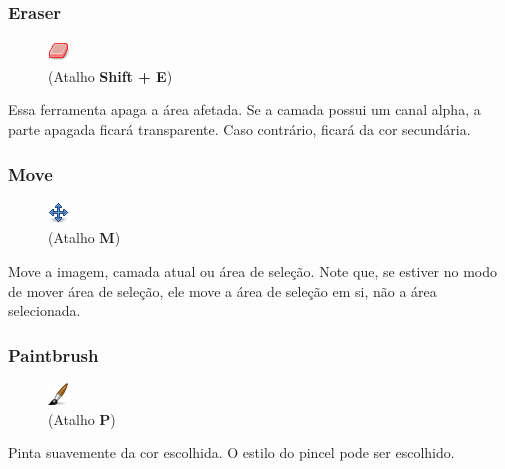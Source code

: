 \documentclass[12pt,onecolumn]{article}
\begin{document}
    \subsubsection{Eraser}
    \begin{figure}
      \vspace{-40pt}
      \begin{center}
        \includegraphics{gimp-icons/stock-tool-eraser-22.png} \\
        (Atalho {\bf Shift + E})
      \end{center}
      \label{fig:eraser}
      \vspace{-20pt}
    \end{figure}
    Essa ferramenta apaga a área afetada. Se a camada possui um canal alpha, a parte apagada ficará
    transparente. Caso contrário, ficará da cor secundária.
    
    
    \subsubsection{Move}
    \begin{figure}
      \vspace{-40pt}
      \begin{center}
        \includegraphics{gimp-icons/stock-tool-move-22.png} \\
        (Atalho {\bf M})
      \end{center}
      \label{fig:move}
      \vspace{-20pt}
    \end{figure}
    Move a imagem, camada atual ou área de seleção. Note que, se estiver no modo de mover área de
    seleção, ele move a área de seleção em si, não a área selecionada.
    
    \subsubsection{Paintbrush}
    \begin{figure}
      \vspace{-40pt}
      \begin{center}
        \includegraphics{gimp-icons/stock-tool-paintbrush-22.png} \\
        (Atalho {\bf P})
      \end{center}
      \label{fig:brush}
      \vspace{-20pt}
    \end{figure}
    Pinta suavemente da cor escolhida. O estilo do pincel pode ser escolhido.
    
\end{document}
